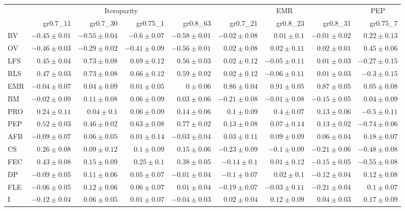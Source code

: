 \begin{landscape}
\begin{table}
\begin{footnotesize}
\begin{tabular}{@{}l|rrrr|rrr|r@{}}
\toprule
 & \multicolumn{4}{c|}{Iteroparity} & \multicolumn{3}{c|}{EMR} & \multicolumn{1}{c}{PEP}\\
 & gr0.7\_11 & gr0.7\_30 & gr0.75\_1 & gr0.8\_63 & gr0.7\_21 & gr0.8\_23 & gr0.8\_31 & gr0.75\_7\\
\midrule
BV & $-0.45 \pm 0.01$ & $-0.55 \pm 0.04$ & $-0.6 \pm 0.07$ & $-0.58 \pm 0.01$ & $-0.02 \pm 0.08$ & $0.01 \pm 0.1$ & $-0.01 \pm 0.02$ & $0.22 \pm 0.13$\\
OV & $-0.46 \pm 0.03$ & $-0.29 \pm 0.02$ & $-0.41 \pm 0.09$ & $-0.56 \pm 0.01$ & $0.02 \pm 0.08$ & $0.02 \pm 0.11$ & $0.02 \pm 0.01$ & $0.45 \pm 0.06$\\
LFS & $0.45 \pm 0.04$ & $0.73 \pm 0.08$ & $0.69 \pm 0.12$ & $0.56 \pm 0.03$ & $0.02 \pm 0.12$ & $-0.05 \pm 0.11$ & $0.01 \pm 0.03$ & $-0.27 \pm 0.15$\\
RLS & $0.47 \pm 0.03$ & $0.73 \pm 0.08$ & $0.66 \pm 0.12$ & $0.59 \pm 0.02$ & $0.02 \pm 0.12$ & $-0.06 \pm 0.11$ & $0.01 \pm 0.03$ & $-0.3 \pm 0.15$\\
EMR & $-0.04 \pm 0.07$ & $0.04 \pm 0.09$ & $0.01 \pm 0.05$ & $0 \pm 0.06$ & $0.86 \pm 0.04$ & $0.91 \pm 0.05$ & $0.87 \pm 0.05$ & $0.05 \pm 0.08$\\
BM & $-0.02 \pm 0.09$ & $0.11 \pm 0.08$ & $0.06 \pm 0.09$ & $0.03 \pm 0.06$ & $-0.21 \pm 0.08$ & $-0.01 \pm 0.08$ & $-0.15 \pm 0.05$ & $0.04 \pm 0.09$\\
PRO & $0.24 \pm 0.11$ & $0.04 \pm 0.1$ & $0.06 \pm 0.09$ & $0.14 \pm 0.06$ & $0.1 \pm 0.09$ & $0.4 \pm 0.07$ & $0.13 \pm 0.06$ & $-0.5 \pm 0.11$\\
PEP & $0.52 \pm 0.03$ & $0.46 \pm 0.02$ & $0.63 \pm 0.08$ & $0.77 \pm 0.02$ & $0.13 \pm 0.08$ & $0.07 \pm 0.14$ & $0.13 \pm 0.02$ & $-0.74 \pm 0.06$\\
AFB & $-0.09 \pm 0.07$ & $0.06 \pm 0.05$ & $0.01 \pm 0.14$ & $-0.03 \pm 0.04$ & $0.03 \pm 0.11$ & $0.09 \pm 0.09$ & $0.06 \pm 0.04$ & $0.18 \pm 0.07$\\
CS & $0.26 \pm 0.08$ & $0.09 \pm 0.12$ & $0.1 \pm 0.09$ & $0.15 \pm 0.06$ & $-0.23 \pm 0.09$ & $-0.1 \pm 0.09$ & $-0.21 \pm 0.06$ & $-0.48 \pm 0.08$\\
FEC & $0.43 \pm 0.08$ & $0.15 \pm 0.09$ & $0.25 \pm 0.1$ & $0.38 \pm 0.05$ & $-0.14 \pm 0.1$ & $0.01 \pm 0.12$ & $-0.15 \pm 0.05$ & $-0.55 \pm 0.08$\\
DP & $-0.09 \pm 0.05$ & $0.11 \pm 0.06$ & $0.05 \pm 0.07$ & $-0.01 \pm 0.04$ & $-0.1 \pm 0.07$ & $0.02 \pm 0.1$ & $-0.12 \pm 0.04$ & $0.12 \pm 0.08$\\
FLE & $-0.06 \pm 0.05$ & $0.12 \pm 0.06$ & $0.06 \pm 0.07$ & $0.01 \pm 0.04$ & $-0.19 \pm 0.07$ & $-0.03 \pm 0.11$ & $-0.21 \pm 0.04$ & $0.1 \pm 0.07$\\
I & $-0.12 \pm 0.04$ & $0.06 \pm 0.05$ & $0.01 \pm 0.07$ & $-0.04 \pm 0.03$ & $0.02 \pm 0.04$ & $0.12 \pm 0.09$ & $0.04 \pm 0.03$ & $0.17 \pm 0.09$\\
\bottomrule
\end{tabular}


\end{footnotesize}
\end{table}
\end{landscape}
